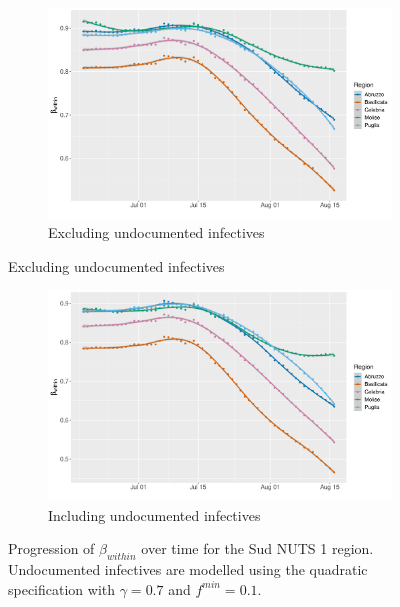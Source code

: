 \documentclass[12pt]{article}
\begin{document}
\begin{appendices}
		\begin{figure}[H]
    	    \centering
    	    \begin{subfigure}{\textwidth}
    	      \centering
    	      \includegraphics[width=0.94\linewidth]{output/model_within_lag14_betawithin_Sud_rolling.pdf}
    	      \caption{Excluding undocumented infectives}
    	      \label{fig:beta_within_over_time_sud_regular}
    	    \end{subfigure}
        \end{figure}
        \begin{figure}[H]\ContinuedFloat
    	    \begin{subfigure}{\textwidth}
    	      \centering
    	      \includegraphics[width=0.94\linewidth]{output/model_within_lag14_betawithin_Sud_UndocQuadratic_rolling.pdf}
    	      \caption{Including undocumented infectives}
    	      \label{fig:beta_within_over_time_sud_regular_undoc}
    	    \end{subfigure}
    	    \caption{Progression of $\beta_{within}$ over time for the Sud NUTS 1 region. Undocumented infectives are modelled using the quadratic specification with $\gamma = 0.7$ and $f^{min}=0.1$.}
    	    \label{fig:beta_within_over_time_sud}
	    \end{figure}
		

\end{appendices}
\end{document}
